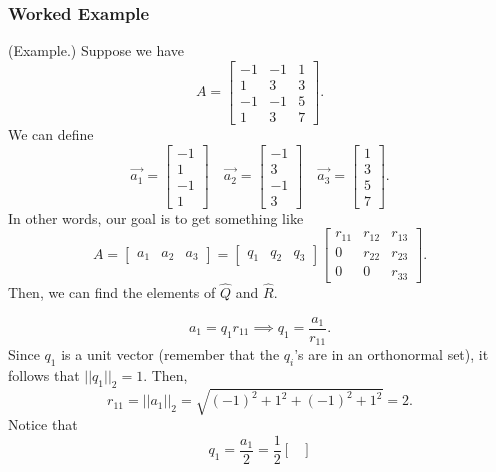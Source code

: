 \documentclass[letterpaper]{article}
\newcommand{\0}{\mathbf{0}}
\begin{document}
\subsubsection{Worked Example}
\begin{mdframed}
    (Example.) Suppose we have \[A = \begin{bmatrix}
        -1 & -1 & 1 \\ 
        1 & 3 & 3 \\ 
        -1 & -1 & 5 \\ 
        1 & 3 & 7
    \end{bmatrix}.\]
    We can define 
    \[\vec{a_1} = \begin{bmatrix}
        -1 \\ 1 \\ -1 \\ 1
    \end{bmatrix} \quad \vec{a_2} = \begin{bmatrix}
        -1 \\ 3 \\ -1 \\ 3
    \end{bmatrix} \quad \vec{a_3} = \begin{bmatrix}
        1 \\ 3 \\ 5 \\ 7
    \end{bmatrix}.\]
    In other words, our goal is to get something like 
    \[A = \begin{bmatrix}
        a_1 & a_2 & a_3
    \end{bmatrix} = \begin{bmatrix}
        q_1 & q_2 & q_3
    \end{bmatrix} \begin{bmatrix}
        r_{11} & r_{12} & r_{13} \\ 
        0 & r_{22} & r_{23} \\ 
        0 & 0 & r_{33}
    \end{bmatrix}.\]
    Then, we can find the elements of $\hat{Q}$ and $\hat{R}$. 
    \begin{mdframed}
        \[a_1 = q_1 r_{11} \implies q_1 = \frac{a_1}{r_{11}}.\]
        Since $q_1$ is a unit vector (remember that the $q_i$'s are in an orthonormal set), it follows that $||q_1||_2 = 1$. Then, 
        \[r_{11} = ||a_{1}||_2 = \sqrt{(-1)^2 + 1^2 + (-1)^2 + 1^2} = 2.\]
        Notice that 
        \[q_1 = \frac{a_1}{2} = \frac{1}{2} \begin{bmatrix}

\end{bmatrix}\]
\end{mdframed}
\end{mdframed}
\end{document}
